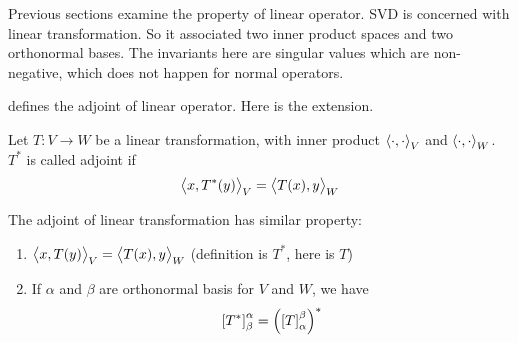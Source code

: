 Previous sections examine the property of linear operator. SVD is concerned with linear transformation. So it associated two inner product spaces and two orthonormal bases. The invariants here are singular values which are non-negative, which does not happen for normal operators.

\begin{definition}
     defines the adjoint of linear operator. Here is the extension.
    
    Let $T:V \rightarrow W$ be a linear transformation, with inner product $\left\langle \displaystyle \cdot, \cdot \right\rangle_V$ and $\left\langle \displaystyle \cdot, \cdot \right\rangle_W$. $T^*$ is called adjoint if 
    \begin{equation}
        \left\langle \displaystyle x, T^*(y) \right\rangle_V = \left\langle \displaystyle T(x), y \right\rangle_W
    \end{equation}
\end{definition}

The adjoint of linear transformation has similar property:
\begin{enumerate}
    \item $\left\langle \displaystyle x, T(y) \right\rangle_V = \left\langle \displaystyle T(x), y \right\rangle_W$ (definition is $T^*$, here is $T$)
    \item If $\alpha$ and $\beta$ are orthonormal basis for $V$ and $W$, we have \begin{equation}
        \coordinate{T^*}_\beta^\alpha = \left(\coordinate{T}_\alpha^\beta\right)^*
    \end{equation}
\end{enumerate}


